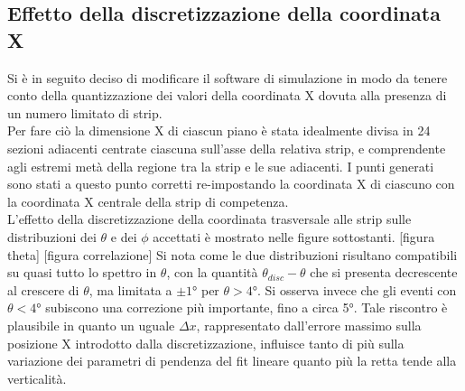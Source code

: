 \documentclass[8pt]{extarticle}
\begin{document}

\subsection{Effetto della discretizzazione della coordinata X}
Si è in seguito deciso di modificare il software di simulazione in modo da tenere conto della quantizzazione dei valori della coordinata X dovuta alla presenza di un numero limitato di strip.\\
Per fare ciò la dimensione X di ciascun piano è stata idealmente divisa in 24 sezioni adiacenti centrate ciascuna sull'asse della relativa strip, e comprendente agli estremi metà della regione tra la strip e le sue adiacenti. I punti generati sono stati a questo punto corretti re-impostando la coordinata X di ciascuno con la coordinata X centrale della strip di competenza. \\
L'effetto della discretizzazione della coordinata trasversale alle strip sulle distribuzioni dei $\theta$ e dei $\phi$ accettati è mostrato nelle figure sottostanti.
[figura theta]
[figura correlazione]
Si nota come le due distribuzioni risultano compatibili su quasi tutto lo spettro in $\theta$, con la quantità $\theta_{disc}-\theta$ che si presenta decrescente al crescere di $\theta$, ma limitata a $\pm 1°$ per $\theta>4°$. Si osserva invece che gli eventi con $\theta < 4°$ subiscono una correzione più importante, fino a circa 5°. Tale riscontro è plausibile in quanto un uguale $\Delta x$, rappresentato dall'errore massimo sulla posizione X introdotto dalla discretizzazione, influisce tanto di più sulla variazione dei parametri di pendenza del fit lineare quanto più la retta tende alla verticalità.\\
\end{document}
